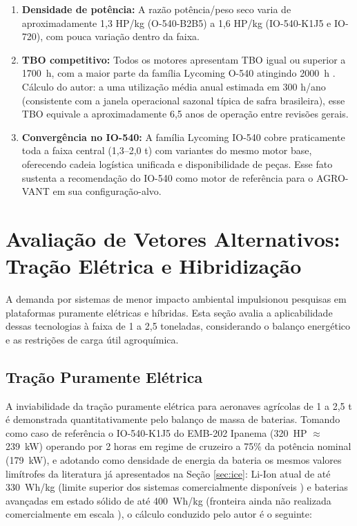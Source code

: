 \documentclass[a4paper,12pt]{article}
\begin{document}
\begin{enumerate}
    \item \textbf{Densidade de potência:} A razão potência/peso seco varia de aproximadamente 1{,}3 HP/kg (O-540-B2B5) a 1{,}6 HP/kg (IO-540-K1J5 e IO-720), com pouca variação dentro da faixa.
    \item \textbf{TBO competitivo:} Todos os motores apresentam TBO igual ou superior a \SI{1700}{h}, com a maior parte da família Lycoming O-540 atingindo \SI{2000}{h} \cite{lycomingmanual}. Cálculo do autor: a uma utilização média anual estimada em 300 h/ano (consistente com a janela operacional sazonal típica de safra brasileira), esse TBO equivale a aproximadamente 6{,}5 anos de operação entre revisões gerais.
    \item \textbf{Convergência no IO-540:} A família Lycoming IO-540 cobre praticamente toda a faixa central (1{,}3--2{,}0 t) com variantes do mesmo motor base, oferecendo cadeia logística unificada e disponibilidade de peças. Esse fato sustenta a recomendação do IO-540 como motor de referência para o AGRO-VANT em sua configuração-alvo.
\end{enumerate}

\section{Avaliação de Vetores Alternativos: Tração Elétrica e Hibridização}

A demanda por sistemas de menor impacto ambiental impulsionou pesquisas em plataformas puramente elétricas e híbridas. Esta seção avalia a aplicabilidade dessas tecnologias à faixa de 1 a 2{,}5 toneladas, considerando o balanço energético e as restrições de carga útil agroquímica.

\subsection{Tração Puramente Elétrica}
\label{sec:eletrica}

A inviabilidade da tração puramente elétrica para aeronaves agrícolas de 1 a 2{,}5 t é demonstrada quantitativamente pelo balanço de massa de baterias. Tomando como caso de referência o IO-540-K1J5 do EMB-202 Ipanema (\SI{320}{HP} $\approx$ \SI{239}{kW}) operando por 2 horas em regime de cruzeiro a 75\% da potência nominal (\SI{179}{kW}), e adotando como densidade de energia da bateria os mesmos valores limítrofes da literatura já apresentados na Seção \ref{sec:ice}: Li-Ion atual de até \SI{330}{Wh/kg} (limite superior dos sistemas comercialmente disponíveis \cite{battery_aviation_review, aerospace_america_batteries}) e baterias avançadas em estado sólido de até \SI{400}{Wh/kg} (fronteira ainda não realizada comercialmente em escala \cite{battery_aviation_review}), o cálculo conduzido pelo autor é o seguinte:
\end{document}
